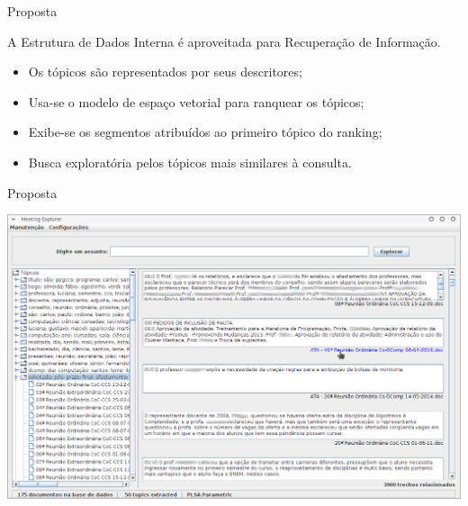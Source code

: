 \documentclass[xcolor=dvipsnames]{beamer}
\begin{document}
 
\begin{frame}{Proposta}



A Estrutura de Dados Interna é aproveitada para Recuperação de Informação.


\nblock{ } {
	\begin{itemize}
		\item Os tópicos são representados por seus descritores;
		\item Usa-se o modelo de espaço vetorial para ranquear os tópicos;
		\item Exibe-se os segmentos atribuídos ao primeiro tópico do ranking;
		\item Busca exploratória pelos tópicos mais similares à consulta.
	\end{itemize}
}



\end{frame}



\begin{frame}{Proposta}

		\includegraphics[width=\textwidth]{images/tela-principal-2-1.png}

\end{frame}
\end{document}

